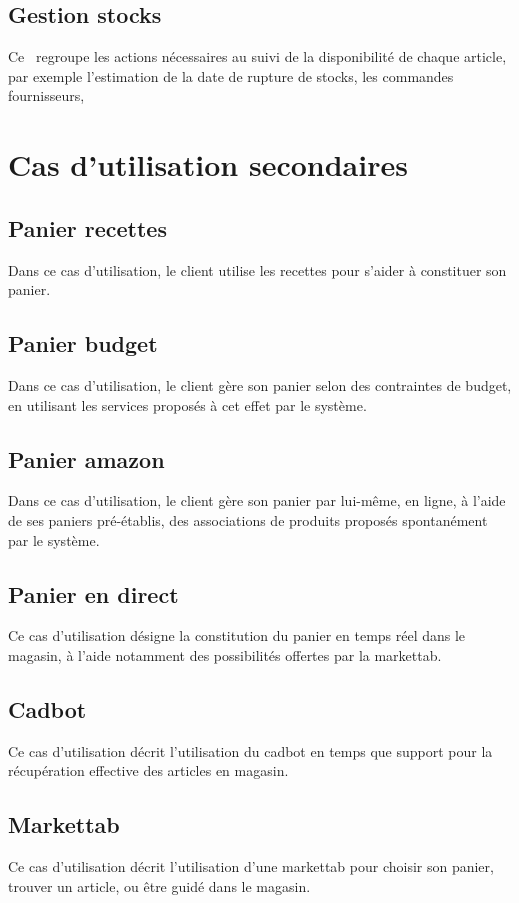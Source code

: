 \subsection{Gestion stocks}
Ce \cu\ regroupe les actions nécessaires au suivi de la disponibilité de chaque article, par exemple l'estimation de la date de rupture de stocks, les commandes fournisseurs, \etc

\section{Cas d'utilisation secondaires}

\subsection{Panier recettes}
Dans ce cas d'utilisation, le client utilise les recettes pour s'aider à constituer son panier.

\subsection{Panier budget}
Dans ce cas d'utilisation, le client gère son panier selon des contraintes de budget, en utilisant les services proposés à cet effet par le système.

\subsection{Panier amazon}
Dans ce cas d'utilisation, le client gère son panier par lui-même, en ligne, à l'aide de ses paniers pré-établis, des associations de produits proposés spontanément par le système.

\subsection{Panier en direct}
Ce cas d'utilisation désigne la constitution du panier en temps réel dans le magasin, à l'aide notamment des possibilités offertes par la markettab.

\subsection{Cadbot}
Ce cas d'utilisation décrit l'utilisation du cadbot en temps que support pour la récupération effective des articles en magasin.

\subsection{Markettab}
Ce cas d'utilisation décrit l'utilisation d'une markettab pour choisir son panier, trouver un article, ou être guidé dans le magasin.


